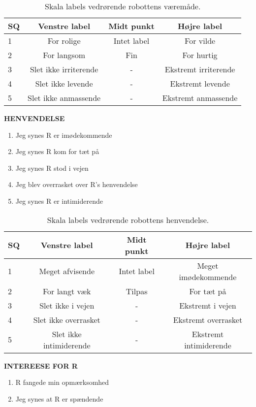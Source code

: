 %
\begin{table}[H]
	\centering 
	\begin{tabular}{l|c|c|c}
		SQ     & Venstre label & Midt punkt & Højre label \\\hline
		1   & For rolige & Intet label & For vilde     \\\hline
		2   & For langsom & Fin & For hurtig   \\\hline
		3   & Slet ikke irriterende & - & Ekstremt irriterende \\\hline
	 	4   & Slet ikke levende & - & Ekstremt levende         \\\hline
		5   & Slet ikke anmassende & - & Ekstremt anmassende             
	\end{tabular}
	\caption{Skala labels vedrørende robottens væremåde.}
	\label{tab:VaeremaadeSkala}
\end{table}
\noindent
%
\textbf{HENVENDELSE}
%
\begin{enumerate}
  \item Jeg synes R er imødekommende
  \item Jeg synes R kom for tæt på
  \item Jeg synes R stod i vejen
  \item Jeg blev overrasket over R's henvendelse
  \item Jeg synes R er intimiderende\\
\end{enumerate}
%
\begin{table}[H]
	\centering
	\begin{tabular}{l|c|c|c}
		SQ     & Venstre label & Midt punkt & Højre label \\\hline
		1   & Meget afvisende & Intet label & Meget imødekommende         \\\hline
		2   & For langt væk & Tilpas & For tæt på    \\\hline
		3   & Slet ikke i vejen & -  & Ekstremt i vejen  \\\hline
	 	4   & Slet ikke overrasket &  -  & Ekstremt overrasket \\\hline
		5   & Slet ikke intimiderende & - & Ekstremt intimiderende           
	\end{tabular}
	\caption{Skala labels vedrørende robottens henvendelse.}
	\label{tab:HenvendelseSkala} 
\end{table}
\noindent
%
\textbf{INTEREESE FOR R}\\
%
\begin{enumerate}
  \item R fangede min opmærksomhed
  \item Jeg synes at R er spændende
\end{enumerate}
